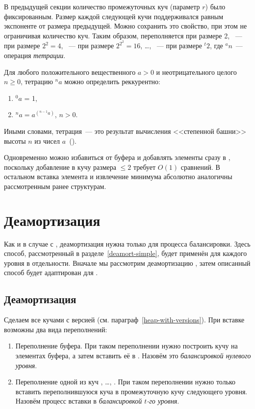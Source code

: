 В предыдущей секции количество промежуточных куч (параметр $r$) было фиксированным.
Размер каждой следующей кучи поддерживался равным экспоненте от размера
предыдущей. Можно сохранить это свойство, при этом не ограничивая количество куч.
Таким образом, \MH[1] переполняется при размере 2, \MH[2]~--- при размере $2^2 = 4$,
\MH[3]~--- при размере $2^{2^2} = 16$, \dots, \MH[t]~--- при размере ${}^{t}2$,
где ${}^{a}n$~--- операция \emph{тетрации}.

\begin{definition}
Для любого положительного вещественного $a > 0$ и неотрицательного целого $n \geq 0$,
тетрацию ${}^na$ можно определить реккурентно:
\begin{enumerate}
\item ${}^0a$ = 1,
\item ${}^na = a^{({}^{n-1}a)}$, $n > 0$.
\end{enumerate}
Иными словами, тетрация~--- это результат вычисления <<степенной башни>> высоты $n$
из чисел $a$~(\cite{tetration}).
\end{definition}

Одновременно можно избавиться от буфера и добавлять элементы сразу в \MH[1], поскольку
добавление в кучу размера $\leq 2$ требует $O(1)$ сравнений. В остальном
вставка элемента и извлечение минимума абсолютно аналогичны рассмотренным ранее структурам.

\section{Деамортизация}
Как и в случае с \SCH, деамортизация нужна только для процесса балансировки.
Здесь способ, рассмотренный в разделе~\ref{deamort-simple}, будет применён для
каждого уровня в отдельности. Вначале мы рассмотрим деамортизацию \CH[r],
затем описанный способ будет адаптирован для \CH[*].

\subsection{Деамортизация \CH[r]}
Сделаем все \MH[t] кучами с версией (см. параграф~\ref{heap-with-versions}).
При вставке возможны два вида переполнений:
\begin{enumerate}
\item Переполнение буфера. При таком переполнении нужно построить кучу на элементах
    буфера, а затем вставить её в \MH[1]. Назовём это \emph{балансировкой нулевого уровня}.
\item Переполнение одной из куч \MH[1], \dots, \MH[r-1]. При таком переполнении
    нужно только вставить переполнившуюся куча в промежуточную кучу следующего
    уровня. Назовём процесс вставки \MH[t] в \MH[t+1] \emph{балансировкой $t$-го уровня}.
\end{enumerate}

